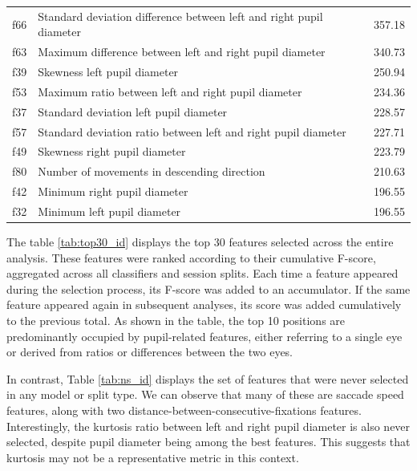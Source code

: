 \documentclass{article}
\begin{document}
\begin{table}[htbp]
\begin{tabular}{lll}
f66 & Standard deviation difference between left and right pupil diameter & 357.18 \\
f63 & Maximum difference between left and right pupil diameter & 340.73 \\
f39 & Skewness left pupil diameter & 250.94 \\
f53 & Maximum ratio between left and right pupil diameter & 234.36 \\
f37 & Standard deviation left pupil diameter & 228.57 \\
f57 & Standard deviation ratio between left and right pupil diameter & 227.71 \\
f49 & Skewness right pupil diameter & 223.79 \\
f80 & Number of movements in descending direction & 210.63 \\
f42 & Minimum right pupil diameter & 196.55 \\
f32 & Minimum left pupil diameter & 196.55 \\
\bottomrule
\end{tabular}
\end{table}

The table \ref{tab:top30_id} displays the top 30 features selected across the entire analysis.
These features were ranked according to their cumulative F-score, aggregated across all classifiers and session splits.
Each time a feature appeared during the selection process, its F-score was added to an accumulator. 
If the same feature appeared again in subsequent analyses, its score was added cumulatively to the previous total.
As shown in the table, the top 10 positions are predominantly occupied by pupil-related features, either referring to a single eye or derived from ratios or differences between the two eyes.

{\raggedright
In contrast, Table \ref{tab:ns_id} displays the set of features that were never selected in any model or split type.
We can observe that many of these are saccade speed features, along with two distance-between-consecutive-fixations features.
Interestingly, the kurtosis ratio between left and right pupil diameter is also never selected, despite pupil diameter being among the best features. 
This suggests that kurtosis may not be a representative metric in this context.
\par}
\end{document}
